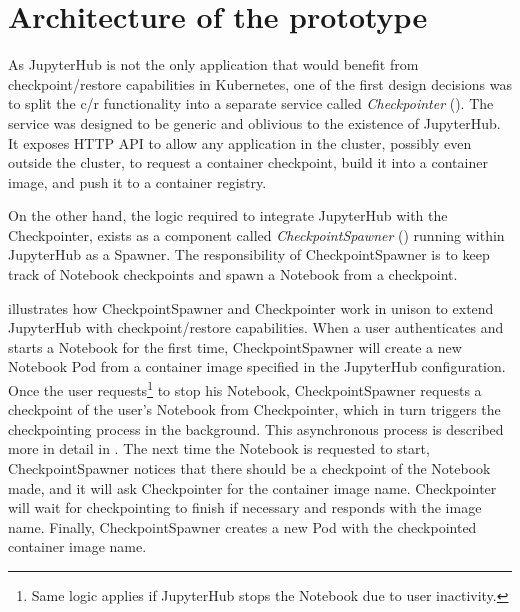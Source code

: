 \documentclass[
  digital,     %
  oneside,     %
  nosansbold,  %
  nocolorbold, %
  lof,         %
  nolot,         %
]{fithesis4}
\begin{document}
\section{Architecture of the prototype}
As JupyterHub is not the only application that would benefit from checkpoint/restore capabilities in Kubernetes, one of the first design decisions was to split the c/r functionality into a separate service called \emph{Checkpointer} (). The service was designed to be generic and oblivious to the existence of JupyterHub. It exposes HTTP API to allow any application in the cluster, possibly even outside the cluster, to request a container checkpoint, build it into a container image, and push it to a container registry.

On the other hand, the logic required to integrate JupyterHub with the Checkpointer, exists as a component called \emph{CheckpointSpawner} () running within JupyterHub as a Spawner. The responsibility of CheckpointSpawner is to keep track of Notebook checkpoints and spawn a Notebook from a checkpoint.

 illustrates how CheckpointSpawner and Checkpointer work in unison to extend JupyterHub with checkpoint/restore capabilities. When a user authenticates and starts a Notebook for the first time, CheckpointSpawner will create a new Notebook Pod from a container image specified in the JupyterHub configuration. Once the user requests\footnote{Same logic applies if JupyterHub stops the Notebook due to user inactivity.} to stop his Notebook, CheckpointSpawner requests a checkpoint of the user's Notebook from Checkpointer, which in turn triggers the checkpointing process in the background. This asynchronous process is described more in detail in . The next time the Notebook is requested to start, CheckpointSpawner notices that there should be a checkpoint of the Notebook made, and it will ask Checkpointer for the container image name. Checkpointer will wait for checkpointing to finish if necessary and responds with the image name. Finally, CheckpointSpawner creates a new Pod with the checkpointed container image name.
\end{document}
